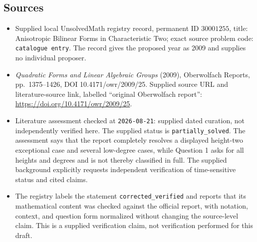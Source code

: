 \documentclass[11pt]{article}
\begin{document}
\subsection{Sources}
\begin{itemize}
\item Supplied local UnsolvedMath registry record, permanent ID \(30001255\), title: Anisotropic Bilinear Forms in Characteristic Two; exact source problem code: \texttt{catalogue entry}. The record gives the proposed year as 2009 and supplies no individual proposer.
\item \emph{Quadratic Forms and Linear Algebraic Groups} (2009), Oberwolfach Reports, pp.\ 1375--1426, DOI 10.4171/owr/2009/25. Supplied source URL and literature-source link, labelled ``original Oberwolfach report'': \url{https://doi.org/10.4171/owr/2009/25}.
\item Literature assessment checked at \texttt{2026-08-21}: supplied dated curation, not independently verified here. The supplied status is \texttt{partially\_solved}. The assessment says that the report completely resolves a displayed height-two exceptional case and several low-degree cases, while Question 1 asks for all heights and degrees and is not thereby classified in full. The supplied background explicitly requests independent verification of time-sensitive status and cited claims.
\item The registry labels the statement \texttt{corrected\_verified} and reports that its mathematical content was checked against the official report, with notation, context, and question form normalized without changing the source-level claim. This is a supplied verification claim, not verification performed for this draft.
\end{itemize}
\end{document}
